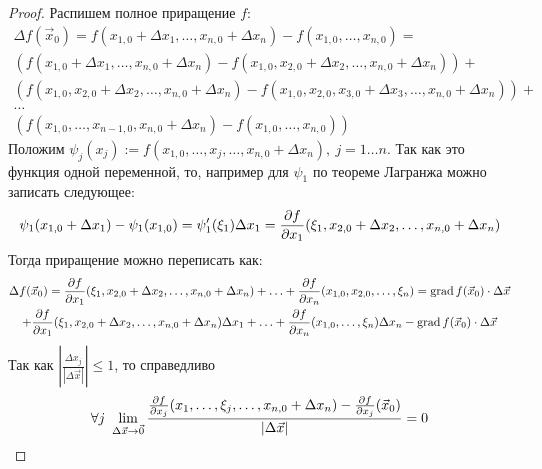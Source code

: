 \begin{proof}
	Распишем полное приращение $f$:
	\begin{multline*}
		\Delta f(\vec{x}_0) = f(x_{1, 0} + \Delta x_1, \ldots, x_{n, 0} + \Delta x_n) - f(x_{1, 0}, \ldots, x_{n, 0}) =
		\\
		\left(f(x_{1, 0} + \Delta x_1, \ldots, x_{n, 0} + \Delta x_n) - f(x_{1, 0}, x_{2, 0} + \Delta x_2, \ldots, x_{n, 0} + \Delta x_n)\right) +
		\\
		\left(f(x_{1, 0}, x_{2, 0} + \Delta x_2, \ldots, x_{n, 0} + \Delta x_n) - f(x_{1, 0}, x_{2, 0}, x_{3, 0} + \Delta x_3, \ldots, x_{n, 0} + \Delta x_n)\right) + 
		\\
		\ldots\\
		\left(f(x_{1, 0}, \ldots, x_{n - 1, 0}, x_{n, 0} + \Delta x_n) - f(x_{1, 0}, \ldots, x_{n, 0})\right)
	\end{multline*}
	Положим $\psi_j(x_j) := f(x_{1, 0}, \ldots, x_j, \ldots, x_{n, 0} + \Delta x_n),\  j = 1\ldots n$. Так как это функция одной переменной, то, например для $\psi_1$ по теореме Лагранжа можно записать следующее:
	\[
		\psi_1(x_{1, 0} + \Delta x_1) - \psi_1(x_{1, 0}) = \psi'_1(\xi_1)\Delta x_1 = \frac{\partial f}{\partial x_1}(\xi_1, x_{2, 0} + \Delta x_2, \ldots, x_{n, 0} + \Delta x_n)
	\]
	Тогда приращение можно переписать как:
	\begin{multline*}
		\Delta f(\vec{x}_0) = \frac{\partial f}{\partial x_1}(\xi_1, x_{2, 0} + \Delta x_2, \ldots, x_{n, 0} + \Delta x_n) + \ldots + \frac{\partial f}{\partial x_n}(x_{1, 0}, x_{2, 0}, \ldots, \xi_n) = 
		\operatorname{grad} f(\vec{x}_0)\cdot \Delta\vec{x}\\
		+ \frac{\partial f}{\partial x_1}(\xi_1, x_{2, 0} + \Delta x_2, \ldots, x_{n, 0} + \Delta x_n) \Delta x_1 + \ldots + \frac{\partial f}{\partial x_n}(x_{1, 0}, \ldots, \xi_n)\Delta x_n - \operatorname{grad} f(\vec{x}_0)\cdot \Delta\vec{x}
	\end{multline*}
	Так как $|\frac{\Delta x_j}{|\Delta \vec{x}|}| \leq 1$, то справедливо
	\[
		\forall j \ \liml_{\Delta\vec{x} \to \vec{0}}\frac{\frac{\vdelta f}{\vdelta x_j}(x_1, \ldots, \xi_j, \ldots, x_{n, 0} + \Delta x_n) - \frac{\vdelta f}{\vdelta x_j}(\vec{x}_0)}{|\Delta \vec{x}|} = 0
	\]
\end{proof}
